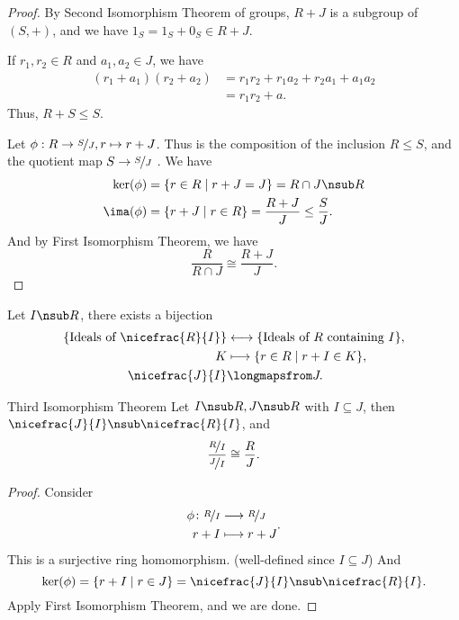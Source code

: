 \begin{proof}
    By Second Isomorphism Theorem of groups, \(R + J\) is a subgroup of \((S, +)\), and we have \(1_S = 1_S + 0_S \in R + J\).

    If \(r_1, r_2 \in R\) and \(a_1, a_2 \in J\), we have
    \begin{align*}
        (r_1 + a_1)(r_2 + a_2) &= r_{1}r_2 +r_1 a_2 + r_2 a_1 + a_1 a_{2}\\
        &= r_1 r_2 + a.
    \end{align*}
    Thus, \(R+S \leq S\).

    Let \(\phi: R \to \nicefrac{S}{J}, r \mapsto r + J\). Thus is the composition of the inclusion \(R\leq S\), and the quotient map \(S \to \nicefrac{S}{J}\) . We have
    \begin{align*}
        \ker(\phi) &= \{r\in R \mid r + J = J\} = R \cap J \nsub R\\
        \ima(\phi) &= \{r + J \mid r \in R\} = \frac{R + J}{J} \leq \frac{S}{J}.
    \end{align*}
    And by First Isomorphism Theorem, we have
    \[
        \frac{R}{R \cap J} \cong \frac{R + J}{J}.
    \]
\end{proof}
\begin{note}
    Let \(I \nsub R\), there exists a bijection
    \begin{align*}
        \{\text{Ideals of }\nicefrac{R}{I}\} &\longleftrightarrow\{\text{Ideals of }R\text{ containing }I\},\\
        K &\longmapsto \{r\in R\mid r + I \in K\},\\
        \nicefrac{J}{I}&\longmapsfrom J.
    \end{align*}
\end{note}
\begin{theorem}{Third Isomorphism Theorem}{}
    Let \(I\nsub R, J \nsub R\) with \(I \subseteq J\), then \(\nicefrac{J}{I}\nsub \nicefrac{R}{I}\), and
    \[
        \frac{\nicefrac{R}{I}}{\nicefrac{J}{I}}\cong \frac{R}{J}.
    \]
\end{theorem}
\begin{proof}
    Consider
    \[
    \begin{aligned}
      \phi\colon \nicefrac{R}{I} & \longrightarrow \nicefrac{R}{J}      \\
      r+I          & \longmapsto r+J
    \end{aligned}.
    \]
    This is a surjective ring homomorphism. (well-defined since \(I \subseteq J\)) And
    \[
        \ker(\phi) = \{r + I \mid r \in J\} = \nicefrac{J}{I} \nsub \nicefrac{R}{I}.
    \]
    Apply First Isomorphism Theorem, and we are done.
\end{proof}
